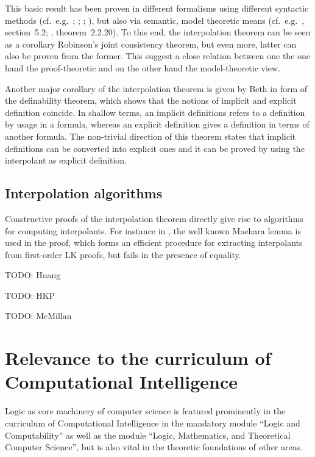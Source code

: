 \documentclass[,%
			paper=a4,%
			DIV12,
			liststotoc,
			bibtotoc,
			draft=false,%
			numbers=noendperiod
			]{scrartcl}
\theoremstyle{definition}
\begin{document}
This basic result has been proven in different formalisms using different syntactic methods (cf.~e.g.~\cite{craig57linear}; \cite{takeuti1987proof}; \cite{krajivcek1997interpolation}; \cite{Pudlak97}), but also via semantic, model theoretic means (cf.~e.g.~\cite{shoenfield1967mathematical}, section~5.2; \cite{chang1990model}, theorem~2.2.20).
To this end, the interpolation theorem can be seen as a corollary Robinson's joint consistency theorem, but even more, latter can also be proven from the former. 
This suggest a close relation between one the one hand the proof-theoretic and on the other hand the model-theoretic view.

Another major corollary of the interpolation theorem is given by Beth in form of the definability theorem, which shows that the notions of implicit and explicit definition coincide.
In shallow terms, an implicit definitions refers to a definition by usage in a formula, whereas an explicit definition gives a definition in terms of another formula.
The non-trivial direction of this theorem states that implicit definitions can be converted into explicit ones and it can be proved by using the interpolant as explicit definition.


\subsection{Interpolation algorithms}

Constructive proofs of the interpolation theorem directly give rise to algorithms for computing interpolants. For instance in \cite{takeuti1987proof}, the well known Maehara lemma is used in the proof, which forms an efficient procedure for extracting interpolants from first-order LK proofs, but fails in the presence of equality.

TODO: Huang

TODO: HKP

TODO: McMillan




\section{Relevance to the curriculum of Computational Intelligence}

Logic as core machinery of computer science is featured prominently in the curriculum of Computational Intelligence in the mandatory module ``Logic and Computability'' as well as the module ``Logic, Mathematics, and Theoretical Computer Science'', but is also vital in the theoretic foundations of other areas. 
\end{document}
